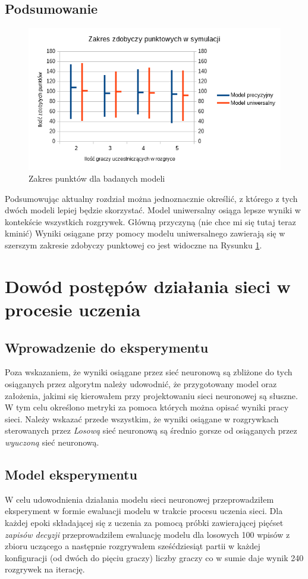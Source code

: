 \documentclass[12pt, oneside]{report}
\begin{document}
\section{Podsumowanie}
\begin{figure}[h]
	\includegraphics[width=\linewidth]{ZakresPunktow.png}
	\caption{Zakres punktów dla badanych modeli}
	\label{figure:points_range}
\end{figure}
Podsumowując aktualny rozdział można jednoznacznie określić, z którego z tych dwóch modeli lepiej będzie skorzystać. Model uniwersalny osiąga lepsze wyniki w kontekście wszystkich rozgrywek. Główną przyczyną (nie chce mi się tutaj teraz kminić) Wyniki osiągane przy pomocy modelu uniwersalnego zawierają się w szerszym zakresie zdobyczy punktowej co jest widoczne na Rysunku \ref{figure:points_range}.

\chapter{Dowód postępów działania sieci w procesie uczenia}
\section{Wprowadzenie do eksperymentu}
Poza wskazaniem, że wyniki osiągane przez sieć neuronową są zbliżone do tych osiąganych przez algorytm należy udowodnić, że przygotowany model oraz założenia, jakimi się kierowałem przy projektowaniu sieci neuronowej są słuszne. W tym celu określono metryki za pomoca których można opisać wyniki pracy sieci. Należy wskazać przede wszystkim, że wyniki osiągane w rozgrywkach sterowanych przez \textit{Losową} sieć neuronową są średnio gorsze od osiąganych przez \textit{wyuczoną} sieć neuronową.
\section{Model eksperymentu}
W celu udowodnienia działania modelu sieci neuronowej przeprowadziłem eksperyment w formie ewaluacji modelu w trakcie procesu uczenia sieci. Dla każdej epoki składającej się z uczenia za pomocą próbki zawierającej pięćset \textit{zapisów decyzji} przeprowadziłem ewaluację modelu dla losowych 100 wpisów z zbioru uczącego a następnie rozgrywałem sześćdziesiąt partii w każdej konfiguracji (od dwóch do pięciu graczy) liczby graczy co w sumie daje wynik 240 rozgrywek na iterację.
\end{document}
